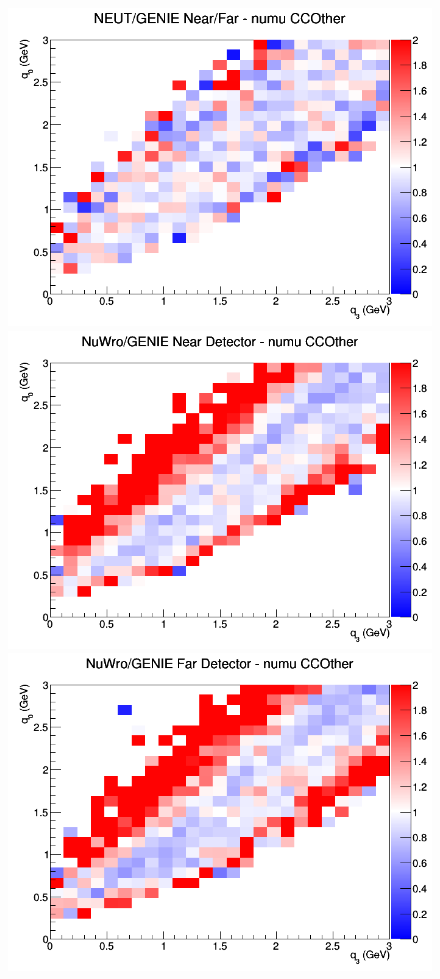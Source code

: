 \begin{figure}[h]
\endminipage
{}
\includegraphics[width=\linewidth]{eff_q0_q3/LAr/ratios/CCOther_NEUT_GENIE_numu_NF_q3_q0.png}
\endminipage
\newline
{}
\includegraphics[width=\linewidth]{eff_q0_q3/LAr/ratios/CCOther_NuWro_GENIE_numu_near_q3_q0.png}
\endminipage
{}
\includegraphics[width=\linewidth]{eff_q0_q3/LAr/ratios/CCOther_NuWro_GENIE_numu_far_q3_q0.png}

\end{figure}
